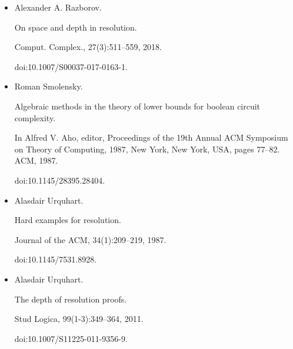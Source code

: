 \begin{itemize}
\item 
[31]

Alexander A. Razborov.


On space and depth in resolution.


Comput. Complex., 27(3):511–559, 2018.


doi:10.1007/S00037-017-0163-1.





\item 
[32]

Roman Smolensky.


Algebraic methods in the theory of lower bounds for boolean circuit
complexity.


In Alfred V. Aho, editor, Proceedings of the 19th Annual ACM
Symposium on Theory of Computing, 1987, New York, New York, USA, pages
77–82. ACM, 1987.


doi:10.1145/28395.28404.





\item 
[33]

Alasdair Urquhart.


Hard examples for resolution.


Journal of the ACM, 34(1):209–219, 1987.


doi:10.1145/7531.8928.





\item 
[34]

Alasdair Urquhart.


The depth of resolution proofs.


Stud Logica, 99(1-3):349–364, 2011.


doi:10.1007/S11225-011-9356-9.





\end{itemize}
